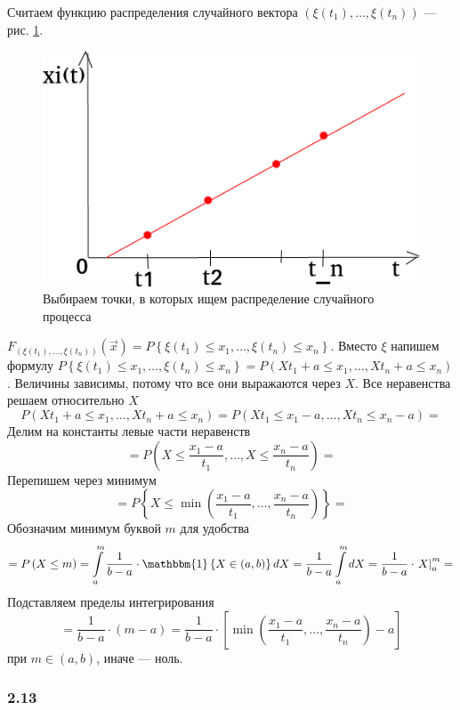 Считаем функцию распределения случайного вектора
$ \left( \xi \left( t_1 \right), \dotsc, \xi \left( t_n \right) \right) $ --- рис. \ref{fig:2121}.

\begin{figure}[h!]
 \centering
 \includegraphics[width=.5\textwidth]{./pictures/2_12_1.png}
 \caption{Выбираем точки, в которых ищем распределение случайного процесса}
 \label{fig:2121}
\end{figure}

$F_{ \left( \xi \left( t_1 \right), \dotsc, \xi \left( t_n \right) \right) }
  \left( \vec{x} \right) =
  P \left\{ \xi \left( t_1 \right) \leq x_1, \dotsc, \xi \left( t_n \right) \leq x_n \right\} $.
Вместо $ \xi $ напишем формулу
$P \left\{ \xi \left( t_1 \right) \leq x_1, \dotsc, \xi \left( t_n \right) \leq x_n \right\} =
  P \left( Xt_1 + a \leq x_1, \dotsc, Xt_n + a \leq x_n \right) $.
Величины зависимы, потому что все они выражаются через $X$.
Все неравенства решаем относительно $X$
$$P \left( Xt_1 + a \leq x_1, \dotsc, Xt_n + a \leq x_n \right) =
  P \left( Xt_1 \leq x_1 - a, \dotsc, Xt_n \leq x_n - a \right) =$$
Делим на константы левые части неравенств
$$= P \left( X \leq \frac{x_1 - a}{t_1}, \dotsc, X \leq \frac{x_n - a}{t_n} \right) =$$
Перепишем через минимум
$$= P \left\{
    X \leq \min \left( \frac{x_1 - a}{t_1}, \dotsc, \frac{x_n - a}{t_n} \right)
  \right\} =$$
Обозначим минимум буквой $m$ для удобства
$$= P \left( X \leq m \right) =
  \int \limits_a^m \frac{1}{b - a} \cdot \mathbbm{1} \left\{ X \in \left( a, b \right) \right\} dX =
  \frac{1}{b - a} \int \limits_a^m dX =
  \frac{1}{b - a} \cdot \left. X \right|_a^m =$$
Подставляем пределы интегрирования
$$= \frac{1}{b - a} \cdot \left( m - a \right) =
  \frac{1}{b - a} \cdot
  \left[ \min \left( \frac{x_1 - a}{t_1}, \dotsc, \frac{x_n - a}{t_n} \right) - a \right] $$
при $m \in \left( a, b \right) $, иначе --- ноль.

\subsubsection*{2.13}


